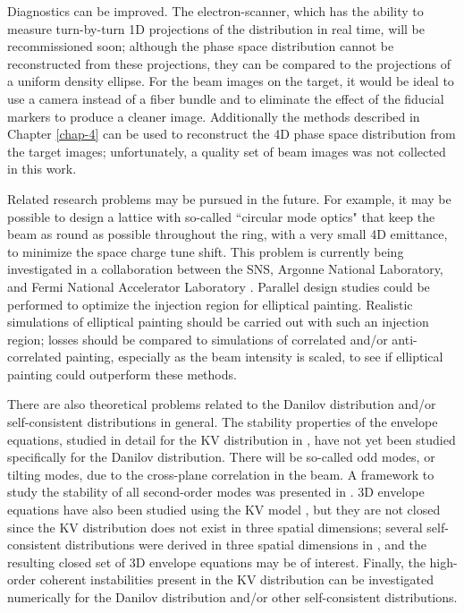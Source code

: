 Diagnostics can be improved. The electron-scanner, which has the ability to measure turn-by-turn 1D projections of the distribution in real time, will be recommissioned soon; although the phase space distribution cannot be reconstructed from these projections, they can be compared to the projections of a uniform density ellipse. For the beam images on the target, it would be ideal to use a camera instead of a fiber bundle and to eliminate the effect of the fiducial markers to produce a cleaner image. Additionally the methods described in Chapter \ref{chap-4} can be used to reconstruct the 4D phase space distribution from the target images; unfortunately, a quality set of beam images was not collected in this work. 

Related research problems may be pursued in the future. For example, it may be possible to design a lattice with so-called ``circular mode optics" that keep the beam as round as possible throughout the ring, with a very small 4D emittance, to minimize the space charge tune shift. This problem is currently being investigated in a collaboration between the SNS, Argonne National Laboratory, and Fermi National Accelerator Laboratory \cite{Morozov-forthcoming}. Parallel design studies could be performed to optimize the injection region for elliptical painting. Realistic simulations of elliptical painting should be carried out with such an injection region; losses should be compared to simulations of correlated and/or anti-correlated painting, especially as the beam intensity is scaled, to see if elliptical painting could outperform these methods. 

There are also theoretical problems related to the Danilov distribution and/or self-consistent distributions in general. The stability properties of the envelope equations, studied in detail for the KV distribution in \cite{Lund2004}, have not yet been studied specifically for the Danilov distribution. There will be so-called odd modes, or tilting modes, due to the cross-plane correlation in the beam. A framework to study the stability of all second-order modes was presented in \cite{Yuan2017}. 3D envelope equations have also been studied using the KV model \cite{Qiang2018}, but they are not closed since the KV distribution does not exist in three spatial dimensions; several self-consistent distributions were derived in three spatial dimensions in \cite{Danilov2003}, and the resulting closed set of 3D envelope equations may be of interest. Finally, the high-order coherent instabilities present in the KV distribution can be investigated numerically for the Danilov distribution and/or other self-consistent distributions. 
